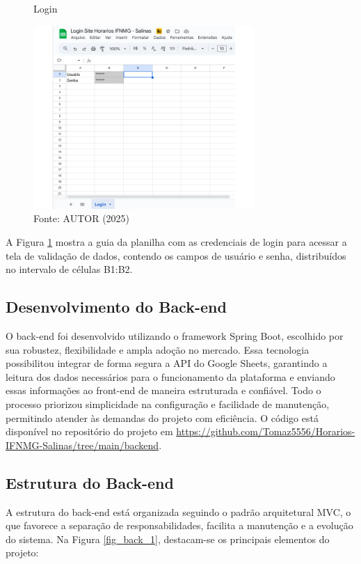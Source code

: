 \begin{figure}[htb]
    \centering
    \caption{Login}
    \includegraphics[width=0.75\textwidth]{Figuras/plan-4.png}
    \caption*{Fonte: AUTOR (2025)}
    \label{fig_plan_4}
\end{figure}

A Figura \ref{fig_plan_4} mostra a guia da planilha com as credenciais de login para acessar a tela de validação de dados, contendo os campos de usuário e senha, distribuídos no intervalo de células B1:B2.

\subsection{Desenvolvimento do Back-end}

O back-end foi desenvolvido utilizando o framework Spring Boot, escolhido por sua robustez, flexibilidade e ampla adoção no mercado. Essa tecnologia possibilitou integrar de forma segura a API do Google Sheets, garantindo a leitura dos dados necessários para o funcionamento da plataforma e enviando essas informações ao front-end de maneira estruturada e confiável. Todo o processo priorizou simplicidade na configuração e facilidade de manutenção, permitindo atender às demandas do projeto com eficiência. O código está disponível no repositório do projeto em \url{https://github.com/Tomaz5556/Horarios-IFNMG-Salinas/tree/main/backend}.

\subsection{Estrutura do Back-end}

A estrutura do back-end está organizada seguindo o padrão arquitetural MVC, o que favorece a separação de responsabilidades, facilita a manutenção e a evolução do sistema. Na Figura \ref{fig_back_1}, destacam-se os principais elementos do projeto:


